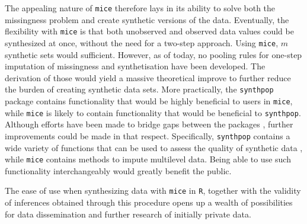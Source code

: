 \documentclass[psych,article,submit,moreauthors,pdftex]{mdpi}
\begin{document}
The appealing nature of \texttt{mice} therefore lays in its ability to
solve both the missingness problem and create synthetic versions of the
data. Eventually, the flexibility with \texttt{mice} is that both
unobserved and observed data values could be synthesized at once,
without the need for a two-step approach. Using \texttt{mice}, \(m\)
synthetic sets would sufficient. However, as of today, no pooling rules
for one-step imputation of missingness and synthetisation have been
developed. The derivation of those would yield a massive theoretical
improve to further reduce the burden of creating synthetic data sets.
More practically, the \texttt{synthpop} package contains functionality
that would be highly beneficial to users in \texttt{mice}, while
\texttt{mice} is likely to contain functionality that would be
beneficial to \texttt{synthpop}. Although efforts have been made to
bridge gaps between the packages \citep[e.g.,][]{miceadds_3.11-6},
further improvements could be made in that respect. Specifically,
\texttt{synthpop} contains a wide variety of functions that can be used
to assess the quality of synthetic data
\citep[e.g.,][]{snoke2018general}, while \texttt{mice} contains methods
to impute multilevel data. Being able to use such functionality
interchangeably would greatly benefit the public.

The ease of use when synthesizing data with \texttt{mice} in \texttt{R},
together with the validity of inferences obtained through this procedure
opens up a wealth of possibilities for data dissemination and further
research of initially private data.

%

\vspace{6pt}

\end{document}
